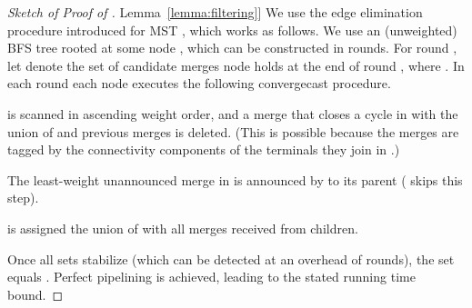 \documentclass[letterpaper,11pt]{article}
\newcommand{\namedref}[2]{\hyperref[#2]{#1~\ref*{#2}}}
\newcommand{\lemmaref}[1]{\namedref{Lemma}{#1}}
\begin{document}
\begin{proof}[Sketch of Proof of \lemmaref{lemma:filtering}]
We use the edge elimination procedure introduced for MST
\cite{GarayKP-98,KuttenP-98}, which works as follows. We use an (unweighted) BFS
tree rooted at some node , which can be constructed in  rounds.
For round , let  denote the set of candidate merges node  holds at the end of round , where . In each round each
node executes the following convergecast procedure.
\begin{compactenum}
\item  is scanned in ascending weight order, and a merge that closes
a cycle in  with the union of  and previous merges is deleted. (This
is possible because the merges are tagged by the connectivity components of
the terminals they join in .)
\item The least-weight unannounced merge in  is announced by  to
its parent ( skips this step).
\item  is assigned the union of  with all merges received
from children.
\end{compactenum}
Once all sets stabilize (which can be detected at an overhead of 
rounds), the set  equals .
Perfect pipelining is achieved, leading to the stated running time bound.
\end{proof}
\end{document}
